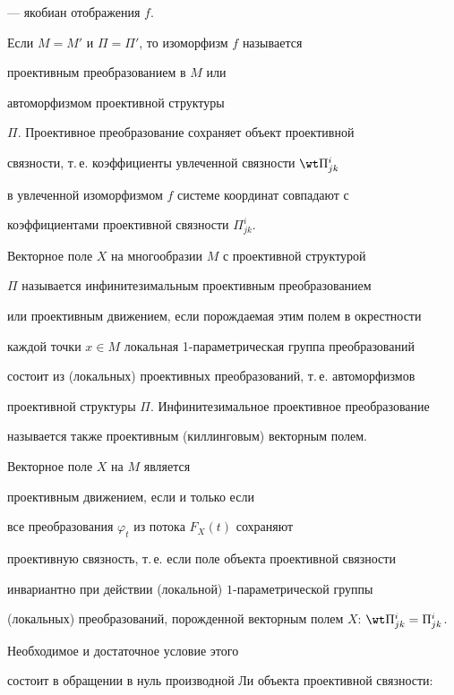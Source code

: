 --- якобиан отображения $f$.





Если $M = M'$ и $\Pi = \Pi '$, то изоморфизм $f$ называется


проективным преобразованием в $M$ или


автоморфизмом проективной структуры


$\Pi$. Проективное преобразование сохраняет объект проективной


связности, т.\,е. коэффициенты увлеченной связности $\wt\Pi^i_{jk}$


в увлеченной изоморфизмом $f$ системе координат совпадают с


коэффициентами проективной связности $\Pi^i_{jk}$.





Векторное поле $X$ на многообразии $M$ с проективной структурой


$\Pi$ называется инфинитезимальным проективным преобразованием


или проективным движением, если порождаемая этим полем в окрестности


каждой точки $x\in M$ локальная 1-параметрическая группа преобразований


состоит из (локальных) проективных преобразований, т.\,е. автоморфизмов


проективной структуры $\Pi$. Инфинитезимальное проективное преобразование 


называется также проективным (киллинговым) векторным полем.





Векторное поле $X$ на $M$ является 


проективным движением, если и только если


все преобразования $\varphi _t$ из потока $F_X(t)$ сохраняют


проективную связность, т.\,е. если поле объекта проективной связности


инвариантно при действии (локальной) $1$-параметрической группы


(локальных) преобразований, порожденной векторным полем $X$: $\wt


\Pi^i_{jk}=\Pi^i_{jk}$.


Необходимое и достаточное условие этого


состоит в обращении в нуль производной Ли объекта проективной связности:



